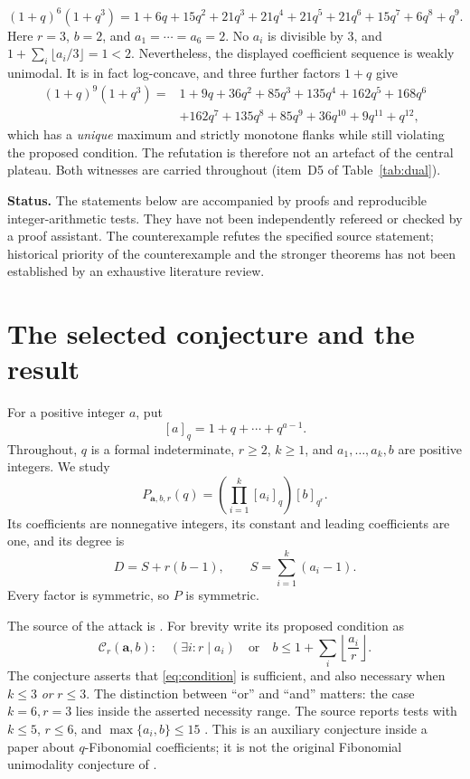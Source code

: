 \documentclass[11pt]{article}
\theoremstyle{research}
\theoremstyle{definition}
\newcommand{\qi}[1]{[#1]_q}
\newcommand{\qir}[2]{[#1]_{q^{#2}}}
\numberwithin{equation}{section}
\begin{document}
\begin{tcolorbox}[resultbox,title={The counterexample at a glance, and a strict companion}]
\[
 (1+q)^6(1+q^3)
 =1+6q+15q^2+21q^3+21q^4+21q^5+21q^6+15q^7+6q^8+q^9.
\]
Here $r=3$, $b=2$, and $a_1=\cdots=a_6=2$.
No $a_i$ is divisible by $3$, and
$1+\sum_i\lfloor a_i/3\rfloor=1<2$.
Nevertheless, the displayed coefficient sequence is weakly unimodal.
It is in fact log-concave, and three further factors $1+q$ give
\begin{align*}
 (1+q)^9(1+q^3)={}&1+9q+36q^2+85q^3+135q^4+162q^5+168q^6\\
   &+162q^7+135q^8+85q^9+36q^{10}+9q^{11}+q^{12},
\end{align*}
which has a \emph{unique} maximum and strictly monotone flanks while still
violating the proposed condition. The refutation is therefore not an artefact
of the central plateau. Both witnesses are carried throughout
(item~D5 of Table~\ref{tab:dual}).
\end{tcolorbox}

\noindent\textbf{Status.} The statements below are accompanied by proofs and
reproducible integer-arithmetic tests. They have not been independently
refereed or checked by a proof assistant. The counterexample refutes the
specified source statement; historical priority of the counterexample and
the stronger theorems has not been established by an exhaustive literature review.

\section{The selected conjecture and the result}
\label{sec:target}
For a positive integer $a$, put
\[
 \qi{a}=1+q+\cdots+q^{a-1}.
\]
Throughout, $q$ is a formal indeterminate, $r\ge2$, $k\ge1$, and
$a_1,\ldots,a_k,b$ are positive integers. We study
\begin{equation}\label{eq:product}
 P_{\boldsymbol a,b,r}(q)
   =\left(\prod_{i=1}^{k}\qi{a_i}\right)\qir{b}{r}.
\end{equation}
Its coefficients are nonnegative integers, its constant and leading
coefficients are one, and its degree is
\begin{equation}\label{eq:degree}
 D=S+r(b-1),\qquad S=\sum_{i=1}^k(a_i-1).
\end{equation}
Every factor is symmetric, so $P$ is symmetric.

The source of the attack is \cite[Section 5.2, Conjecture 5.4, p.~14]{CIMSY}.
For brevity write its proposed condition as
\begin{equation}\label{eq:condition}
 \mathcal C_r(\boldsymbol a,b):\quad
 (\exists i\colon r\mid a_i)
 \quad\text{or}\quad
 b\le 1+\sum_i\left\lfloor\frac{a_i}{r}\right\rfloor.
\end{equation}
The conjecture asserts that \eqref{eq:condition} is sufficient, and also
necessary when $k\le3$ \emph{or} $r\le3$.
The distinction between ``or'' and ``and'' matters: the case
$k=6,r=3$ lies inside the asserted necessity range.
The source reports tests with $k\le5$, $r\le6$, and
$\max\{a_i,b\}\le15$ \cite[p.~14]{CIMSY}.
This is an auxiliary conjecture inside a paper about $q$-Fibonomial
coefficients; it is not the original Fibonomial unimodality conjecture
of \cite{BCK}.
\end{document}
